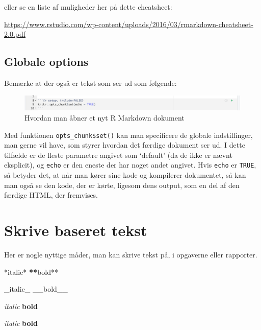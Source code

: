 \documentclass[
]{book}
\newenvironment{Shaded}{\begin{snugshade}}{\end{snugshade}}
\newcommand{\ErrorTok}[1]{\textcolor[rgb]{0.64,0.00,0.00}{\textbf{#1}}}
\newcommand{\NormalTok}[1]{#1}
\newcommand{\SpecialCharTok}[1]{\textcolor[rgb]{0.00,0.00,0.00}{#1}}
\begin{document}
eller se en liste af muligheder her på dette cheatsheet:

\url{https://www.rstudio.com/wp-content/uploads/2016/03/rmarkdown-cheatsheet-2.0.pdf}

\hypertarget{globale-options}{%
\subsection{Globale options}\label{globale-options}}

Bemærke at der også er tekst som ser ud som følgende:

\begin{figure}
\centering
\includegraphics{plots/global_options.png}
\caption{Hvordan man åbner et nyt R Markdown dokument}
\end{figure}

Med funktionen \texttt{opts\_chunk\$set()} kan man specificere de globale indstillinger, man gerne vil have, som styrer hvordan det færdige dokument ser ud. I dette tilfælde er de fleste parametre angivet som `default' (da de ikke er nævnt eksplicit), og \texttt{echo} er den eneste der har noget andet angivet. Hvis \texttt{echo} er \texttt{TRUE}, så betyder det, at når man kører sine kode og kompilerer dokumentet, så kan man også se den kode, der er kørte, ligesom dens output, som en del af den færdige HTML, der fremvises.

\hypertarget{skrive-baseret-tekst}{%
\section{Skrive baseret tekst}\label{skrive-baseret-tekst}}

Her er nogle nyttige måder, man kan skrive tekst på, i opgaverne eller rapporter.

\begin{Shaded}
\begin{Highlighting}[]
\SpecialCharTok{*}\NormalTok{italic}\SpecialCharTok{*}   \ErrorTok{**}\NormalTok{bold}\SpecialCharTok{**}

\NormalTok{\_italic\_   \_\_bold\_\_}
\end{Highlighting}
\end{Shaded}

\emph{italic} \textbf{bold}

\emph{italic} \textbf{bold}
\end{document}
